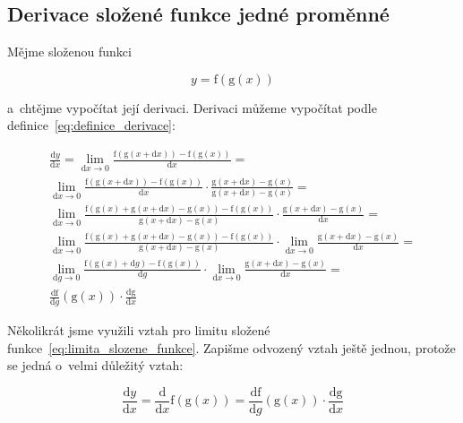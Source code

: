 \subsection{Derivace složené funkce jedné proměnné}

Mějme složenou funkci

\begin{equation}
y = \mathrm{f}(\mathrm{g}(x))
\end{equation}

a~chtějme vypočítat její derivaci. Derivaci můžeme vypočítat podle definice~\eqref{eq:definice_derivace}:

\begin{equation}
\label{eq:derivace_slozene_funkce_vypocet}
\begin{split}
\frac{\mathrm{d}y}{\mathrm{d}x} = \lim_{\mathrm{d}x \to 0} \frac{\mathrm{f}(\mathrm{g}(x + \mathrm{d}x)) - \mathrm{f}(\mathrm{g}(x))}{\mathrm{d}x} = \\
\lim_{\mathrm{d}x \to 0} \frac{\mathrm{f}(\mathrm{g}(x + \mathrm{d}x)) - \mathrm{f}(\mathrm{g}(x))}{\mathrm{d}x} \cdot \frac{\mathrm{g}(x + \mathrm{d}x) - \mathrm{g}(x)}{\mathrm{g}(x + \mathrm{d}x) - \mathrm{g}(x)} = \\
\lim_{\mathrm{d}x \to 0} \frac{\mathrm{f}(\mathrm{g}(x) + \mathrm{g}(x + \mathrm{d}x) - \mathrm{g}(x)) - \mathrm{f}(\mathrm{g}(x))}{\mathrm{g}(x + \mathrm{d}x) - \mathrm{g}(x)} \cdot \frac{\mathrm{g}(x + \mathrm{d}x) - \mathrm{g}(x)}{\mathrm{d}x} = \\
\lim_{\mathrm{d}x \to 0} \frac{\mathrm{f}(\mathrm{g}(x) + \mathrm{g}(x + \mathrm{d}x) - \mathrm{g}(x)) - \mathrm{f}(\mathrm{g}(x))}{\mathrm{g}(x + \mathrm{d}x) - \mathrm{g}(x)} \cdot \lim_{\mathrm{d}x \to 0} \frac{\mathrm{g}(x + \mathrm{d}x) - \mathrm{g}(x)}{\mathrm{d}x} = \\
\lim_{\mathrm{d}g \to 0} \frac{\mathrm{f}(\mathrm{g}(x) + \mathrm{d}g) - \mathrm{f}(\mathrm{g}(x))}{\mathrm{d}g} \cdot \lim_{\mathrm{d}x \to 0} \frac{\mathrm{g}(x + \mathrm{d}x) - \mathrm{g}(x)}{\mathrm{d}x} = \\
\frac{\mathrm{df}}{\mathrm{d}g}(\mathrm{g}(x)) \cdot \frac{\mathrm{dg}}{\mathrm{d}x}
\end{split}
\end{equation}

Několikrát jsme využili vztah pro limitu složené funkce~\eqref{eq:limita_slozene_funkce}. Zapišme odvozený vztah ještě jednou, protože se jedná o~velmi důležitý vztah:

\begin{equation}
\frac{\mathrm{d}y}{\mathrm{d}x} = \frac{\mathrm{d}}{\mathrm{d}x}\mathrm{f}(\mathrm{g}(x)) = \frac{\mathrm{df}}{\mathrm{d}g}(\mathrm{g}(x)) \cdot \frac{\mathrm{dg}}{\mathrm{d}x}
\end{equation}

